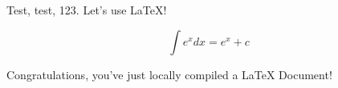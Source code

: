 \documentclass[12pt]{article}
\begin{document}
Test, test, 123. Let's use \LaTeX!

$$\int e^x dx = e^x + c$$

Congratulations, you've just locally compiled a LaTeX Document!
\end{document}
